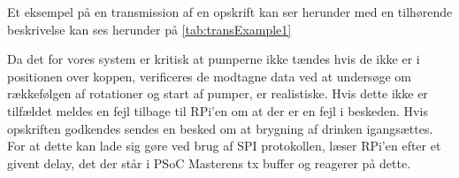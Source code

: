 Et eksempel på en transmission af en opskrift kan ser herunder med en tilhørende beskrivelse kan ses herunder på \ref{tab:transExample1}
\begin{table}[H]
\centering
{}
\caption{Eksempel på en transmission af data med forklaringer}
\label{tab:transExample1}
\end{table}

Da det for vores system er kritisk at pumperne ikke tændes hvis de ikke er i positionen over koppen, verificeres de modtagne data ved at undersøge om rækkefølgen af rotationer og start af pumper, er realistiske. Hvis dette ikke er tilfældet meldes en fejl tilbage til RPi'en om at der er en fejl i beskeden. Hvis opskriften godkendes sendes en besked om at brygning af drinken igangsættes. For at dette kan lade sig gøre ved brug af SPI protokollen, læser RPi'en efter et givent delay, det der står i PSoC Masterens tx buffer og reagerer på dette. 